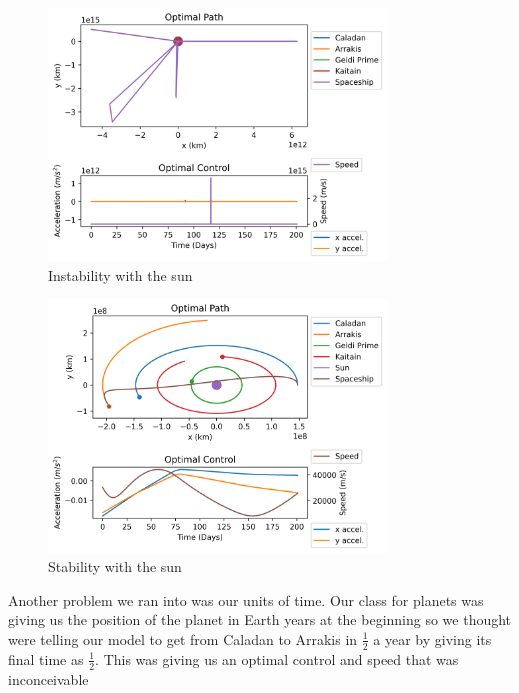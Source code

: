 \documentclass[11pt]{amsart}
\begin{document}
\begin{figure}[htp]
    \centering
    \includegraphics[width=0.8\textwidth]{instability_sun.png}\hfill
    \caption{Instability with the sun}
    \label{fig:fixed_time_sun_bad}
\end{figure}

\begin{figure}[htp]
    \centering
    \includegraphics[width=0.8\textwidth]{f3.png}\hfill
    \caption{Stability with the sun}
    \label{fig:fixed_time_sun_good}
\end{figure}

Another problem we ran into was our units of time. Our class for planets was giving us the position of the planet in Earth years at the beginning so we thought were telling our model to get from Caladan to Arrakis in $\frac{1}{2}$ a year
by giving its final time as $\frac{1}{2}$. This was giving us an optimal control and speed that was inconceivable
\end{document}
